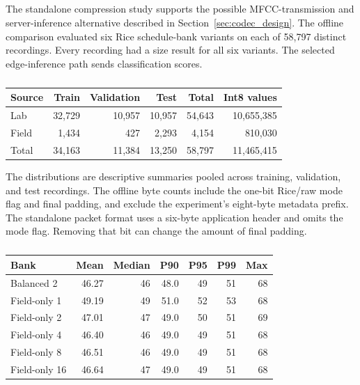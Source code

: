 \subsection{}
\label{sec:codec_results}
\begingroup
\color{black}
The standalone compression study supports the possible MFCC-transmission and server-inference alternative described in Section~\ref{sec:codec_design}. The offline comparison evaluated six Rice schedule-bank variants on each of 58,797 distinct recordings. Every recording had a size result for all six variants. The selected edge-inference path sends classification scores.

\begin{table}[htbp]
\centering
\color{black}
\small
\caption{}
\label{tab:codec_counts}
\begin{tabular}{lrrrrr}
\toprule
Source & Train & Validation & Test & Total & Int8 values \\
\midrule
Lab & 32,729 & 10,957 & 10,957 & 54,643 & 10,655,385 \\
Field & 1,434 & 427 & 2,293 & 4,154 & 810,030 \\
Total & 34,163 & 11,384 & 13,250 & 58,797 & 11,465,415 \\
\bottomrule
\end{tabular}
\end{table}

The distributions are descriptive summaries pooled across training, validation, and test recordings. The offline byte counts include the one-bit Rice/raw mode flag and final padding, and exclude the experiment's eight-byte metadata prefix. The standalone packet format uses a six-byte application header and omits the mode flag. Removing that bit can change the amount of final padding.

\begin{table}[htbp]
\centering
\color{black}
\small
\caption{}
\label{tab:codec_lab}
\begin{tabular}{lrrrrrr}
\toprule
Bank & Mean & Median & P90 & P95 & P99 & Max \\
\midrule
Balanced 2 & 46.27 & 46 & 48.0 & 49 & 51 & 68 \\
Field-only 1 & 49.19 & 49 & 51.0 & 52 & 53 & 68 \\
Field-only 2 & 47.01 & 47 & 49.0 & 50 & 51 & 69 \\
Field-only 4 & 46.40 & 46 & 49.0 & 49 & 51 & 68 \\
Field-only 8 & 46.51 & 46 & 49.0 & 49 & 51 & 68 \\
Field-only 16 & 46.64 & 47 & 49.0 & 49 & 51 & 68 \\
\bottomrule
\end{tabular}
\end{table}

